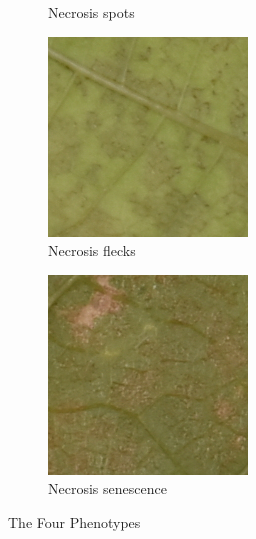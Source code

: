 \documentclass[english]{article}
\begin{document}
\begin{figure}[H]
\begin{subfigure}[b]{0.2\linewidth}
		\caption{Necrosis spots}\label{fig:necrosisspots}
	\end{subfigure}
	\begin{subfigure}[b]{0.2\linewidth}
		\includegraphics[width=\linewidth]{Exp20DM01_inoc2_T6_P47_c_4.png}
		\caption{Necrosis flecks}\label{fig:necrosisstains}
	\end{subfigure}
	\begin{subfigure}[b]{0.2\linewidth}
		\includegraphics[width=\linewidth]{Exp21DM01_inoc1_T6_P27_b_2.png}
		\caption{Necrosis senescence}\label{fig:necrosissenescence}
	\end{subfigure}
	\caption{The Four Phenotypes}\label{fig:phenotypes}
\end{figure}
\end{document}
